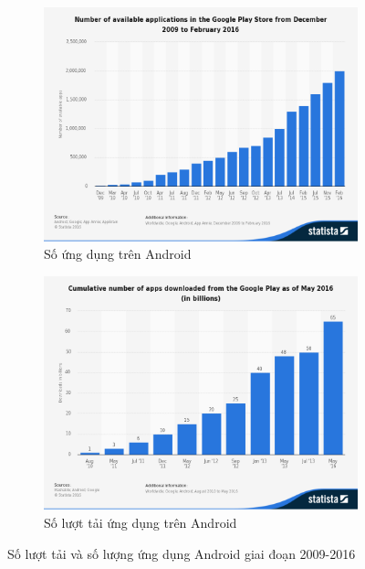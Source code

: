 \documentclass[a4paper]{article}
\begin{document}
\begin{figure}[h]
\centering
\begin{subfigure}{.5\textwidth}
  \centering
  \includegraphics[width=0.95\linewidth]{number_app.png}
  \caption{Số ứng dụng trên Android}
\end{subfigure}%
\begin{subfigure}{.5\textwidth}
  \centering
  \includegraphics[width=0.95\linewidth]{number_app_downloads.PNG}
  \caption{Số lượt tải ứng dụng trên Android}
  \label{fig:sub2}
\end{subfigure}
\caption{Số lượt tải và số lượng ứng dụng Android giai đoạn 2009-2016}
\end{figure} 
\end{document}
